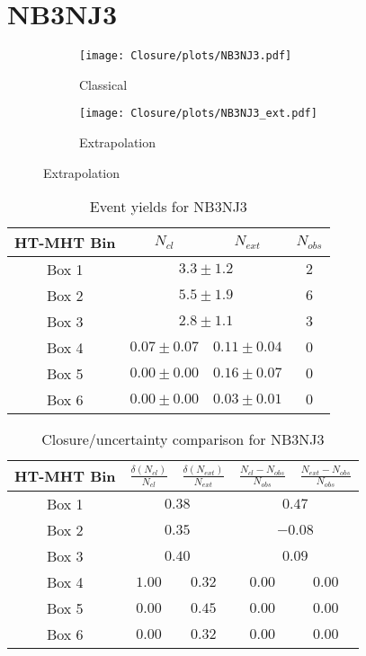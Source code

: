 \documentclass[11pt, oneside]{article}
\begin{document}
\clearpage


\section{NB3NJ3}

\begin{figure}[h]
\centering
\caption{NB3NJ3}
\begin{subfigure}[b]{0.49\textwidth}
\texttt{[image: Closure/plots/NB3NJ3.pdf]}
\caption{Classical}
\end{subfigure}
\begin{subfigure}[b]{0.49\textwidth}
\texttt{[image: Closure/plots/NB3NJ3\_ext.pdf]}
\caption{Extrapolation}
\end{subfigure}
\end{figure}


\begin{table}[h]
\centering
\caption{Event yields for NB3NJ3}
\begin{tabular}{|c|c|c|c|}
\hline
HT-MHT Bin & $N_{cl}$ & $N_{ext}$ & $N_{obs}$ \\
\hline
Box 1 & \multicolumn{2}{c|}{$3.3\pm1.2$} & $  2$ \\ 
Box 2 & \multicolumn{2}{c|}{$5.5\pm1.9$} & $  6$ \\ 
Box 3 & \multicolumn{2}{c|}{$2.8\pm1.1$} & $  3$ \\ 
\hline 
Box 4 & $0.07\pm0.07$ & $0.11\pm0.04$ & $  0$ \\ 
Box 5 & $0.00\pm0.00$ & $0.16\pm0.07$ & $  0$ \\ 
Box 6 & $0.00\pm0.00$ & $0.03\pm0.01$ & $  0$ \\ 
\hline
\end{tabular}
\end{table}


\begin{table}[h]
\centering
\caption{Closure/uncertainty comparison for NB3NJ3}
\begin{tabular}{|c|c|c|c|c|}
\hline
HT-MHT Bin & $\frac{\delta(N_{cl})}{N_{cl}}$ & $\frac{\delta(N_{ext})}{N_{ext}}$ & $\frac{N_{cl}-N_{obs}}{N_{obs}}$ &  $\frac{N_{ext}-N_{obs}}{N_{obs}}$ \\
\hline
Box 1 & \multicolumn{2}{c|}{$0.38$} & \multicolumn{2}{c|}{$0.47$} \\ 
Box 2 & \multicolumn{2}{c|}{$0.35$} & \multicolumn{2}{c|}{$-0.08$} \\ 
Box 3 & \multicolumn{2}{c|}{$0.40$} & \multicolumn{2}{c|}{$0.09$} \\ 
\hline 
Box 4 & $1.00$ & $0.32$ & $0.00$ & $0.00$ \\ 
Box 5 & $0.00$ & $0.45$ & $0.00$ & $0.00$ \\ 
Box 6 & $0.00$ & $0.32$ & $0.00$ & $0.00$ \\ 
\hline
\end{tabular}
\end{table}
\end{document}

